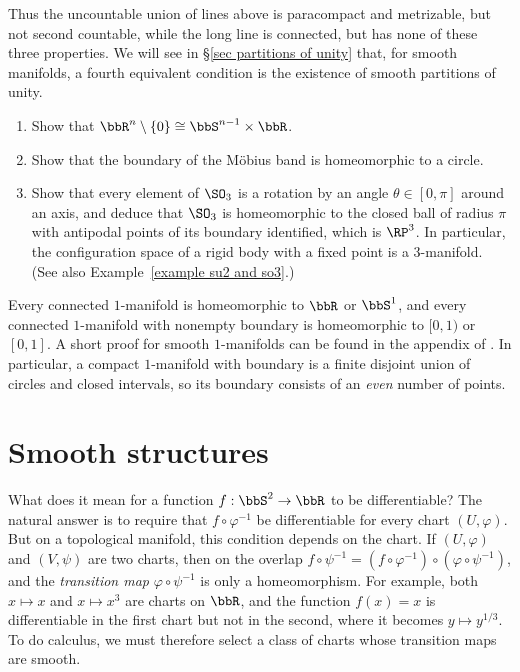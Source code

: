 Thus the uncountable union of lines above is paracompact and metrizable, but not second countable, while the long line is connected, but has none of these three properties. We will see in \S\ref{sec partitions of unity} that, for smooth manifolds, a fourth equivalent condition is the existence of smooth partitions of unity.

\begin{xca}
    \begin{enumerate}
        \item Show that $\bbR^n\setminus\{0\}\cong\bbS^{n-1}\times\bbR$.
        \item Show that the boundary of the M\"obius band is homeomorphic to a circle.
        \item Show that every element of $\SO_3$ is a rotation by an angle $\theta\in[0,\pi]$ around an axis, and deduce that $\SO_3$ is homeomorphic to the closed ball of radius $\pi$ with antipodal points of its boundary identified, which is $\RP^3$. In particular, the configuration space of a rigid body with a fixed point is a $3$-manifold. (See also Example~\ref{example su2 and so3}.)
    \end{enumerate}
\end{xca}

\begin{rem}\label{rem classification of 1-manifolds}
    Every connected $1$-manifold is homeomorphic to $\bbR$ or $\bbS^1$, and every connected $1$-manifold with nonempty boundary is homeomorphic to $[0,1)$ or $[0,1]$. A short proof for smooth $1$-manifolds can be found in the appendix of \cite{MilnorTDV}. In particular, a compact $1$-manifold with boundary is a finite disjoint union of circles and closed intervals, so its boundary consists of an \emph{even} number of points.
\end{rem}


\section{Smooth structures}

What does it mean for a function $f:\bbS^2\to\bbR$ to be differentiable? The natural answer is to require that $f\circ\varphi^{-1}$ be differentiable for every chart $(U,\varphi)$. But on a topological manifold, this condition depends on the chart. If $(U,\varphi)$ and $(V,\psi)$ are two charts, then on the overlap $f\circ\psi^{-1}=(f\circ\varphi^{-1})\circ(\varphi\circ\psi^{-1})$, and the \emph{transition map} $\varphi\circ\psi^{-1}$ is only a homeomorphism. For example, both $x\mapsto x$ and $x\mapsto x^3$ are charts on $\bbR$, and the function $f(x)=x$ is differentiable in the first chart but not in the second, where it becomes $y\mapsto y^{1/3}$. To do calculus, we must therefore select a class of charts whose transition maps are smooth.

